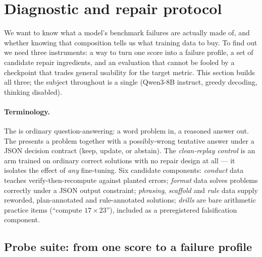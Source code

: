 \section{Diagnostic and repair protocol}
\label{sec:method}

We want to know what a model's benchmark failures are actually made of, and
whether knowing that composition tells us what training data to buy. To find
out we need three instruments: a way to turn one score into a failure profile,
a set of candidate repair ingredients, and an evaluation that cannot be fooled
by a checkpoint that trades general usability for the target metric. This
section builds all three; the subject throughout is a single \prerepair{}
(Qwen3-8B instruct, greedy decoding, thinking disabled).

\paragraph{Terminology.} The \plaingenre{} is ordinary question-answering:
a word problem in, a reasoned answer out. The \repairgenre{} presents a
problem together with a possibly-wrong tentative answer under a JSON decision
contract (keep, update, or abstain). The \emph{clean-replay control} is an
arm trained on ordinary correct solutions with no repair design at all --- it
isolates the effect of \emph{any} fine-tuning. Six candidate components:
\emph{conduct} data teaches verify-then-recompute against planted errors;
\emph{format} data solves problems correctly under a JSON output constraint;
\emph{phrasing}, \emph{scaffold} and \emph{rule} data supply reworded,
plan-annotated and rule-annotated solutions; \emph{drills} are bare
arithmetic practice items (``compute $17\times23$''), included as a
preregistered falsification component.

\subsection{Probe suite: from one score to a failure profile}
\label{sec:probes}

